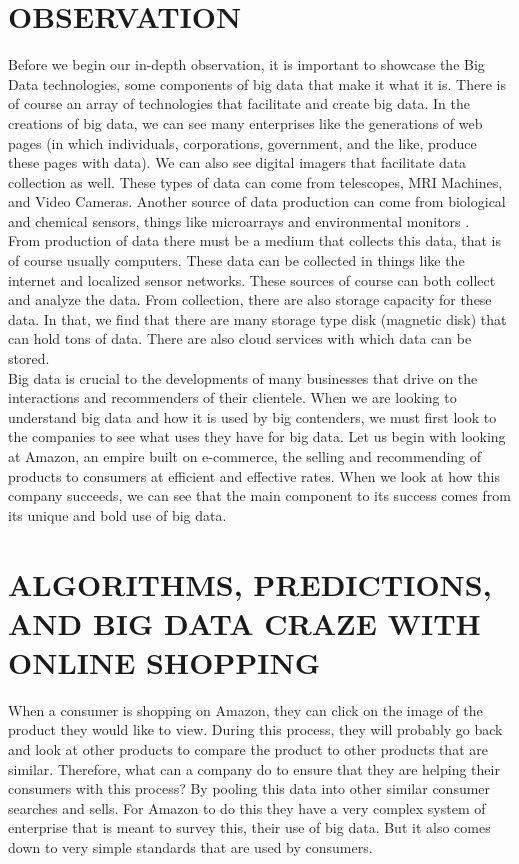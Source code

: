 \documentclass[sigconf]{acmart}
\begin{document}
\section{OBSERVATION}

Before we begin our in-depth observation, it is important to showcase the Big Data technologies, some components of big data that make it what it is. There is of course an array of technologies that facilitate and create big data. In the creations of big data, we can see many enterprises like the generations of web pages (in which individuals, corporations, government, and the like, produce these pages with data). We can also see digital imagers that facilitate data collection as well. These types of data can come from telescopes, MRI Machines, and Video Cameras. Another source of data production can come from biological and chemical sensors, things like microarrays and environmental monitors \cite{3}. \\

From production of data there must be a medium that collects this data, that is of course usually computers. These data can be collected in things like the internet and localized sensor networks. These sources of course can both collect and analyze the data. From collection, there are also storage capacity for these data. In that, we find that there are many storage type disk (magnetic disk) that can hold tons of data. There are also cloud services with which data can be stored.  \\

Big data is crucial to the developments of many businesses that drive on the interactions and recommenders of their clientele. When we are looking to understand big data and how it is used by big contenders, we must first look to the companies to see what uses they have for big data. Let us begin with looking at Amazon, an empire built on e-commerce, the selling and recommending of products to consumers at efficient and effective rates. When we look at how this company succeeds, we can see that the main component to its success comes from its unique and bold use of big data. 

\section{ALGORITHMS, PREDICTIONS, AND BIG DATA CRAZE WITH ONLINE SHOPPING}

When a consumer is shopping on Amazon, they can click on the image of the product they would like to view. During this process, they will probably go back and look at other products to compare the product to other products that are similar. Therefore, what can a company do to ensure that they are helping their consumers with this process? By pooling this data into other similar consumer searches and sells. For Amazon to do this they have a very complex system of enterprise that is meant to survey this, their use of big data. But it also comes down to very simple standards that are used by consumers.  \\
\end{document}
